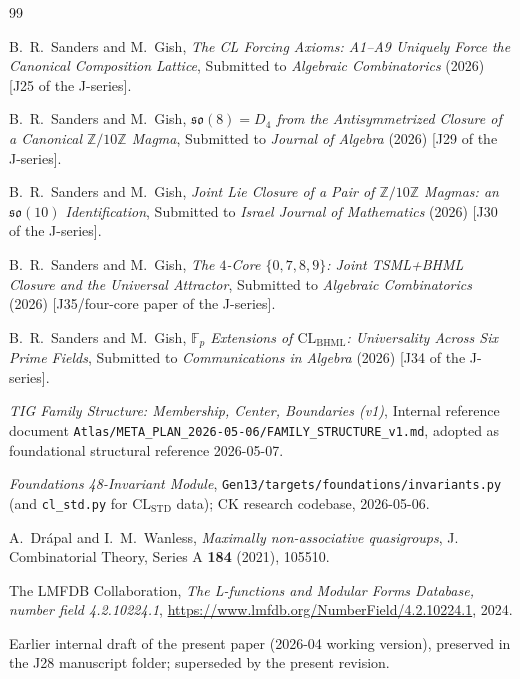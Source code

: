\documentclass[11pt,reqno]{amsart}
\theoremstyle{plain}
\theoremstyle{definition}
\theoremstyle{remark}
\newcommand{\Z}{\mathbb{Z}}
\newcommand{\BHML}{\mathrm{BHML}}
\newcommand{\STD}{\mathrm{STD}}
\begin{document}
\begin{thebibliography}{99}

B.~R.~Sanders and M.~Gish,
\emph{The CL Forcing Axioms: A1--A9 Uniquely Force the Canonical Composition Lattice},
Submitted to \emph{Algebraic Combinatorics} (2026)
[J25 of the J-series].

B.~R.~Sanders and M.~Gish,
\emph{$\mathfrak{so}(8) = D_4$ from the Antisymmetrized Closure of a Canonical $\Z/10\Z$ Magma},
Submitted to \emph{Journal of Algebra} (2026)
[J29 of the J-series].

B.~R.~Sanders and M.~Gish,
\emph{Joint Lie Closure of a Pair of $\Z/10\Z$ Magmas: an $\mathfrak{so}(10)$ Identification},
Submitted to \emph{Israel Journal of Mathematics} (2026)
[J30 of the J-series].

B.~R.~Sanders and M.~Gish,
\emph{The $4$-Core $\{0,7,8,9\}$: Joint TSML+BHML Closure and the Universal Attractor},
Submitted to \emph{Algebraic Combinatorics} (2026)
[J35/four-core paper of the J-series].

B.~R.~Sanders and M.~Gish,
\emph{$\mathbb{F}_p$ Extensions of $\mathrm{CL}_\BHML$: Universality Across Six Prime Fields},
Submitted to \emph{Communications in Algebra} (2026)
[J34 of the J-series].

\emph{TIG Family Structure: Membership, Center, Boundaries (v1)},
Internal reference document
\texttt{Atlas/META\_PLAN\_2026-05-06/FAMILY\_STRUCTURE\_v1.md},
adopted as foundational structural reference 2026-05-07.

\emph{Foundations 48-Invariant Module},
\texttt{Gen13/targets/foundations/invariants.py} (and
\texttt{cl\_std.py} for $\mathrm{CL}_\STD$ data); CK research
codebase, 2026-05-06.

A.~Dr\'apal and I.~M.~Wanless,
\emph{Maximally non-associative quasigroups},
J. Combinatorial Theory, Series A \textbf{184} (2021), 105510.

The LMFDB Collaboration,
\emph{The L-functions and Modular Forms Database, number field 4.2.10224.1},
\url{https://www.lmfdb.org/NumberField/4.2.10224.1}, 2024.

Earlier internal draft of the present paper (2026-04 working version),
preserved in the J28 manuscript folder; superseded by the present
revision.

\end{thebibliography}
\end{document}
